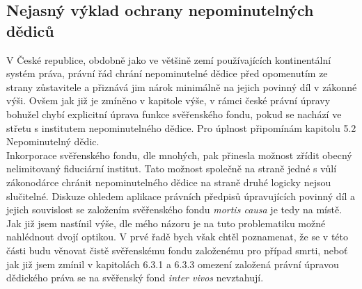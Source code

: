 \documentclass{article}
\begin{document}

\subsection{Nejasný výklad ochrany nepominutelných dědiců}



V České republice, obdobně jako ve většině zemí používajících kontinentální systém práva, právní řád chrání nepominutelné dědice před opomenutím ze strany zůstavitele a přiznává jim nárok minimálně na jejich povinný díl v zákonné výši. Ovšem jak již je zmíněno v kapitole výše, v rámci české právní úpravy bohužel chybí explicitní úprava funkce svěřenského fondu, pokud se nachází ve střetu s institutem nepominutelného dědice. Pro úplnost připomínám kapitolu 5.2 Nepominutelný dědic.\\

Inkorporace svěřenského fondu, dle mnohých, pak přinesla možnost zřídit obecný nelimitovaný fiduciární institut. Tato možnost společně na straně jedné s vůlí zákonodárce chránit nepominutelného dědice na straně druhé logicky nejsou slučitelné. Diskuze ohledem aplikace právních předpisů úpravujících povinný díl a jejich souvislost se založením svěřenského fondu \textit{mortis causa} je tedy na místě.\\

Jak již jsem nastínil výše, dle mého názoru je na tuto problematiku možné nahlédnout dvojí optikou. V prvé řadě bych však chtěl poznamenat, že se v této části budu věnovat čistě svěřenskému fondu založenému pro případ smrti, neboť jak již jsem zmínil v kapitolách 6.3.1 a 6.3.3 omezení založená právní úpravou dědického práva se na svěřenský fond \textit{inter vivos} nevztahují.\\
\end{document}
